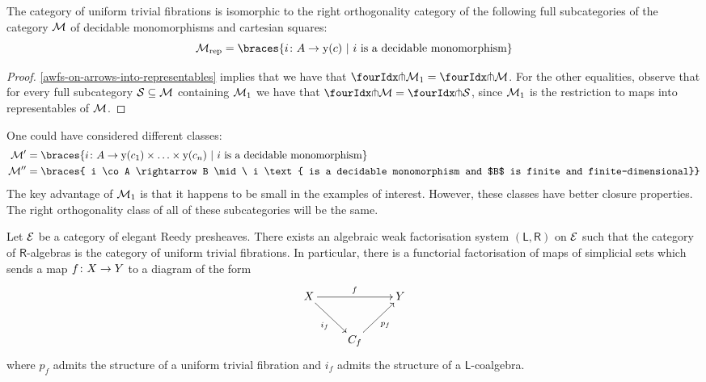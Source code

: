 \documentclass[reqno,10pt,a4paper,oneside]{amsart}
\begin{document}
\begin{lemma} \label{small-gen-triv-kan}
The category of uniform trivial  fibrations is isomorphic to the right orthogonality 
category of the following full subcategories of  the category $\cal{M}$ of decidable
monomorphisms and cartesian squares:
\[
\cal{M}_{\textup{rep}}  = \braces{i \co A \rightarrow \yon(c) \ | \ i \text{ is a  decidable monomorphism} } 
\]
\end{lemma}

\begin{proof}    \cref{awfs-on-arrows-into-representables} implies that we have that $\liftr{\cal{M}_1}  = \liftr{\cal{M}}$.
For the other equalities, observe that for every full subcategory $\cal{S} \subseteq \cal{M}$ containing $\cal{M}_1$ we have that $\liftr{\cal{M}} = \liftr{\cal{S}}$, since $\cal{M}_1$ is the restriction to maps into representables  of $\cal{M}$. 
\end{proof}


\begin{remark} One could have considered different classes:
\begin{align*}
\cal{M}'  & = \braces{i \co A \rightarrow \yon(c_1) \times \ldots \times \yon(c_n)
\ | \ i \text{ is a  decidable monomorphism} }  \\
\cal{M}''  & = \braces{ i \co A \rightarrow B \mid \ i \text{ is a decidable monomorphism and 
$B$ is finite and finite-dimensional}} 
\end{align*}
The key advantage of $\cal{M}_1$ is that it happens to be small in the examples of interest. However, 
these classes have better closure properties. The right orthogonality class of all of these subcategories
will be the same.
\end{remark}





\begin{theorem} Let $\catE$ be a category of elegant Reedy presheaves. 
There exists an algebraic weak factorisation system $(\mathsf{L}, \mathsf{R})$ on
$\cal{E}$ such that the category of $\mathsf{R}$-algebras is the category of uniform trivial  fibrations. 
In particular, there is a functorial factorisation of maps of simplicial sets which sends
a map $f \co X \to Y$ to a diagram of the form
\[
\xymatrix{ 
X \ar[rr]^f \ar[dr]_{i_f}  & & Y \\
 & C_f \ar[ur]_{p_f} }
 \]
 where $p_f$ admits the structure of  a uniform trivial  fibration and 
 $i_f$ admits the structure of a $\mathsf{L}$-coalgebra.
\end{theorem}
\end{document}
